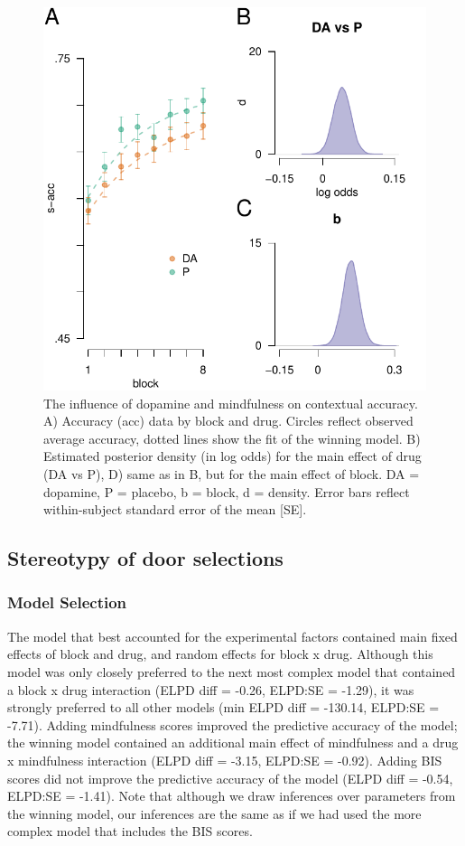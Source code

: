 \documentclass{article}
\begin{document}
\begin{figure}

{\centering \includegraphics[width=0.7\linewidth]{../../images/cacc_fig} 

}

\caption{The influence of dopamine and mindfulness on contextual accuracy. A) Accuracy (acc) data by block and drug. Circles reflect observed average accuracy, dotted lines show the fit of the winning model. B) Estimated posterior density (in log odds) for the main effect of drug (DA vs P), D) same as in B, but for the main effect of block. DA = dopamine, P = placebo, b = block, d = density. Error bars reflect within-subject standard error of the mean [SE].}\label{fig:caccfig}
\end{figure}

\hypertarget{stereotypy-of-door-selections}{%
\subsection{Stereotypy of door
selections}\label{stereotypy-of-door-selections}}

\hypertarget{model-selection-2}{%
\subsubsection{Model Selection}\label{model-selection-2}}

The model that best accounted for the experimental factors contained
main fixed effects of block and drug, and random effects for block x
drug. Although this model was only closely preferred to the next most
complex model that contained a block x drug interaction (ELPD diff =
-0.26, ELPD:SE = -1.29), it was strongly preferred to all other models
(min ELPD diff = -130.14, ELPD:SE = -7.71). Adding mindfulness scores
improved the predictive accuracy of the model; the winning model
contained an additional main effect of mindfulness and a drug x
mindfulness interaction (ELPD diff = -3.15, ELPD:SE = -0.92). Adding BIS
scores did not improve the predictive accuracy of the model (ELPD diff =
-0.54, ELPD:SE = -1.41). Note that although we draw inferences over
parameters from the winning model, our inferences are the same as if we
had used the more complex model that includes the BIS scores.
\end{document}
